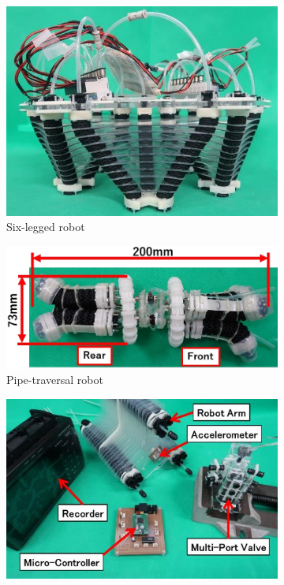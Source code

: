 \documentclass[english,12pt,a4paper,pdftex,eng,utf8]{aaltothesis}
\begin{document}
\begin{figure}[h]
  \centering
  \begin{subfigure}[t]{0.47\textwidth}
    \centering
    \includegraphics[width=\textwidth]{assets/six_legged_robot}
    \caption{Six-legged robot~\cite{Hase2020}}\label{sfig:six_legged_robot}
  \end{subfigure}
  \begin{subfigure}[t]{0.51\textwidth}
    \centering
    \includegraphics[width=\textwidth]{assets/pipe_robot}
    \caption{Pipe-traversal robot~\cite{Shinohara2020}}\label{sfig:pipe_robot}
  \end{subfigure}
  \begin{subfigure}[t]{0.5\textwidth}
    \centering
    \includegraphics[width=\textwidth]{assets/bending_servo_valve}

\end{subfigure}
\end{figure}
\end{document}
